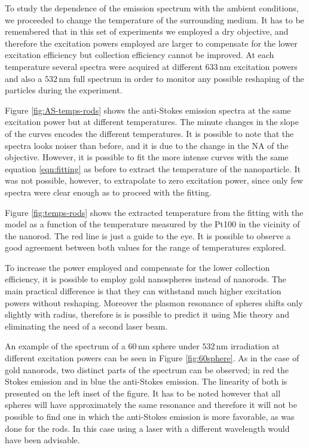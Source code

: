 \documentclass[journal=nalefd,manuscript=letter]{achemso}
\newcommand{\nm}{\ensuremath{\,\textrm{nm}}}
\begin{document}
To study the dependence of the emission spectrum with the ambient conditions, we
proceeded to change the temperature of the surrounding medium. It has to be
remembered that in this set of experiments we employed a dry objective, and
therefore the excitation powers employed are larger to compensate for the lower
excitation efficiency but collection efficiency cannot be improved. At each
temperature several spectra were acquired at different $633\nm$ excitation
powers and also a $532\nm$ full spectrum in order to monitor any possible
reshaping of the particles during the experiment.

Figure \ref{fig:AS-temps-rods} shows the anti-Stokes emission spectra at the
same excitation power but at different temperatures. The minute changes in the
slope of the curves encodes the different temperatures. It is possible to note
that the spectra looks noiser than before, and it is due to the change in the
NA of the objective. However, it is possible to fit the more intense curves with
the same equation \ref{eqn:fitting} as before to extract the temperature of the
nanoparticle. It was not possible, however, to extrapolate to zero excitation
power, since only few spectra were clear enough as to proceed with the fitting. 

Figure \ref{fig:temps-rods} shows the extracted temperature from the fitting
with the model as a function of the temperature measured by the Pt100 in the
vicinity of the nanorod. The red line is just a guide to the eye. It is possible
to observe a good agreement between both values for the range of
temperatures explored. 

To increase the power employed and compensate for the lower collection
efficiency, it is possible to employ gold nanospheres instead of nanorods. The
main practical difference is that they can withstand much higher excitation
powers without reshaping. Moreover the plasmon resonance of spheres shifts only
slightly with radius, therefore is is possible to predict it using
Mie theory and eliminating the need of a second laser beam. 

An example of the spectrum of a $60\nm$ sphere under $532\nm$ irradiation at
different excitation powers can be seen in Figure \ref{fig:60sphere}.
As in the case of gold nanorods, two distinct parts of the spectrum can be
observed; in red the Stokes emission and in blue the anti-Stokes emission. The
linearity of both is presented on the left inset of the figure. It has to be
noted however that all spheres will have approximately the same resonance and
therefore it will not be possible to find one in which the anti-Stokes emission
is more favorable, as was done for the rods. In this case using a laser with a
different wavelength would have been advisable. 
\end{document}
